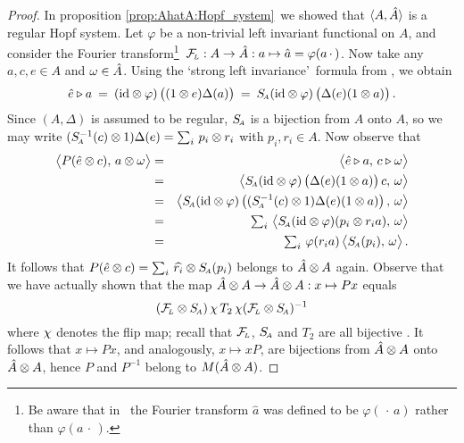 \begin{proof}
In proposition \ref{prop:AhatA:Hopf_system}\ we showed that $\langle A,\hat{A} \rangle$
is a regular Hopf system.
Let $\varphi$ be a non-trivial left invariant functional on $A$, and consider
the Fourier transform\footnote{Be aware that in \cite{Fons:AFGD}\ the
Fourier transform $\hat{a}$ was defined to be
$\varphi(\,\cdot\,a)$ rather than $\varphi(a\,\cdot\,)$.}\
$\mathcal{F}_{\!\scriptscriptstyle L}: A \rightarrow \hat{A}: a \mapsto \hat{a} = \varphi(a\,\cdot\,)$.
Now take any $a,c,e \in A$ and $\omega \in \hat{A}$.
Using the \lq strong left invariance\rq\ formula from \cite{Fons:AFGD}, we obtain
$$ \hat{e} \lact a \:=\:  (\id \tens \varphi)\left( (1 \tens e) \Delta(a) \vertM\right)
                   \:=\: \SA(\id \tens \varphi)\left( \Delta(e) (1 \tens a) \vertM\right). $$
Since $(A,\Delta)$ is assumed to be regular, $S_{\scriptscriptstyle \! A}$ is a bijection from $A$ onto $A$,
so we may write $(S_{\scriptscriptstyle \! A}^{-1}(c) \otimes 1) \Delta(e) = \sum_i \, p_i \otimes r_i$
with $p_i, r_i \in A$. Now observe that
\begin{eqnarray*}
\pairM{P(\hat{e} \tens c)}{a \tens \om}
  &=&
\pairM{\hat{e} \lact a}{c \lact \om}
\\&=&
\pairM{\SA(\id \tens \varphi)\left( \Delta(e) (1 \tens a) \vertM\right) c}{\om}
\\&=&
\pairM{\SA(\id \tens \varphi)\left( (\SA^{-1}(c) \tens 1) \Delta(e) (1 \tens a) \vertM\right)}{\om}
\\&=&
\textstyle \sum_i \, \pairM{\SA(\id \tens \varphi)(p_i \tens r_i a)}{\om}
\\&=&
\textstyle \sum_i \, \varphi(r_i a) \pairM{\SA(p_i)}{\om}.
\end{eqnarray*}
It follows that $P(\hat{e} \otimes c) = \sum_i \,\widehat{r_i} \otimes S_{\scriptscriptstyle \! A}(p_i)$
belongs to $\hat{A} \otimes A$ again.
Observe that we have actually shown that the map
$\hat{A} \otimes A \rightarrow \hat{A} \otimes A : x \mapsto Px$ equals
$$ (\mathcal{F}_{\!\scriptscriptstyle L} \otimes S_{\scriptscriptstyle \! A})\, \chi \, T_2 \, \chi (\mathcal{F}_{\!\scriptscriptstyle L} \otimes S_{\scriptscriptstyle \! A})^{-1}  $$
where $\chi$ denotes the flip map;
recall that $\mathcal{F}_{\!\scriptscriptstyle L}$, $S_{\scriptscriptstyle \! A}$ and $T_2$ are all bijective \cite{Fons:AFGD}.
It follows that $x \mapsto Px$, and analogously, $x \mapsto xP$,
are bijections from $\hat{A} \otimes A$ onto $\hat{A} \otimes A$,
hence $P$ and $P^{-1}$ belong to $M(\hat{A} \otimes A)$.
\end{proof}


